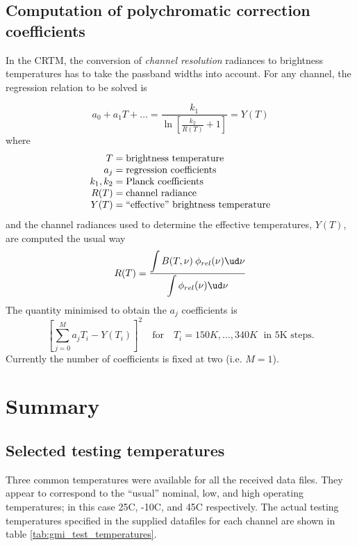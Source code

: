 \subsection{Computation of polychromatic correction coefficients}
In the CRTM, the conversion of \emph{channel resolution} radiances to brightness temperatures has to take the passband widths into account. For any channel, the regression relation to be solved is

\begin{equation}
  a_0 + a_1T + \ldots = \frac{\displaystyle k_1}{\displaystyle \ln\left[\frac{k_2}{R(T)}+1\right]} = Y(T)
\end{equation}
where
\begin{equation}
  \begin{array}{r@{\;=\;}l}
         T &\mbox{brightness temperature} \\
        a_j&\mbox{regression coefficients} \\
    k_1,k_2&\mbox{Planck coefficients} \\
       R(T)&\mbox{channel radiance} \\
       Y(T)&\mbox{``effective'' brightness temperature}
  \end{array}
\end{equation}
and the channel radiances used to determine the effective temperatures, $Y(T)$, are computed the usual way
\begin{equation}
  R(T) = \frac{\displaystyle\int{B(T,\nu)\:\phi_{rel}(\nu)\ud \nu}}{\displaystyle\int{\phi_{rel}(\nu)\ud \nu}}
\end{equation}
The quantity minimised to obtain the $a_j$ coefficients is
\begin{equation}
  \left[ \sum_{j=0}^{M}a_j T_{i} - Y(T_{i}) \right]^2 \quad\mbox{for}\quad T_i = 150K, \ldots, 340K \;\mbox{ in 5K steps.}
\end{equation}
Currently the number of coefficients is fixed at two (i.e. $M=1$).



\newpage
\section{Summary}

\subsection{Selected testing temperatures}
Three common temperatures were available for all the received data files. They appear to correspond to the ``usual'' nominal, low, and high operating temperatures; in this case 25\textdegree{}C, -10\textdegree{}C, and 45\textdegree{}C respectively. The actual testing temperatures specified in the supplied datafiles for each channel are shown in table \ref{tab:gmi_test_temperatures}.

